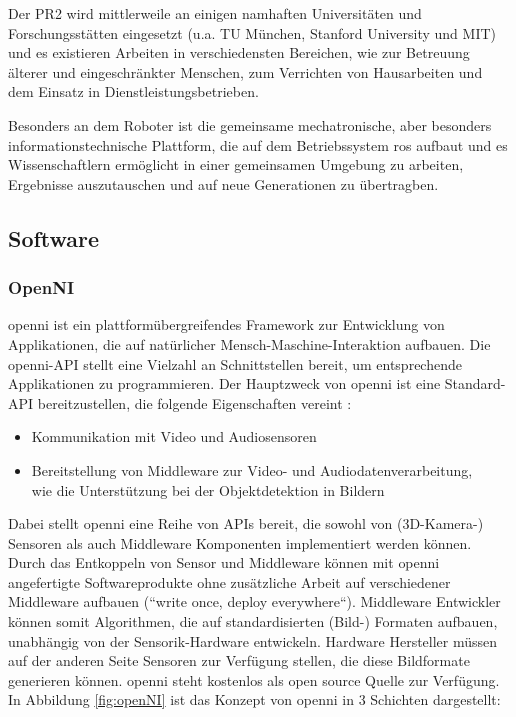 Der PR2 wird mittlerweile an einigen namhaften Universitäten und Forschungsstätten eingesetzt
 (u.a. TU München, Stanford University und MIT) und es existieren Arbeiten in verschiedensten Bereichen,
 wie zur Betreuung älterer und eingeschränkter Menschen, zum Verrichten von Hausarbeiten  und dem Einsatz
 in Dienstleistungsbetrieben.

Besonders an dem Roboter ist die gemeinsame mechatronische, aber besonders informationstechnische Plattform,
 die auf dem Betriebssystem \gls{ros} aufbaut und es Wissenschaftlern
 ermöglicht in einer gemeinsamen Umgebung zu arbeiten, Ergebnisse auszutauschen und auf neue Generationen zu übertragben.

\subsection{Software}

\subsubsection{OpenNI}

\gls{openni} ist ein plattformübergreifendes Framework zur Entwicklung von
Applikationen, die auf natürlicher Mensch-Maschine-Interaktion aufbauen.
 Die \gls{openni}-API stellt eine Vielzahl an Schnittstellen bereit, um
 entsprechende Applikationen zu programmieren. Der Hauptzweck von \gls{openni}
  ist eine Standard-API bereitzustellen, die folgende Eigenschaften vereint \citep{openNI2012}:

\begin{itemize}
  \item Kommunikation mit Video und Audiosensoren
  \item Bereitstellung von Middleware zur Video- und Audiodatenverarbeitung,\\
  wie die Unterstützung bei der Objektdetektion in Bildern
\end{itemize}

Dabei stellt \gls{openni} eine Reihe von APIs bereit, die sowohl von  (3D-Kamera-)
 Sensoren als auch Middleware Komponenten implementiert werden können.
 Durch das Entkoppeln von Sensor und Middleware können mit \gls{openni} angefertigte Softwareprodukte
 ohne zusätzliche Arbeit auf verschiedener Middleware aufbauen (“write once, deploy everywhere“).
 Middleware Entwickler können somit Algorithmen, die auf standardisierten (Bild-) Formaten aufbauen,
 unabhängig von der Sensorik-Hardware entwickeln. Hardware Hersteller müssen auf der anderen Seite
 Sensoren zur Verfügung stellen, die diese Bildformate generieren können. \gls{openni} steht kostenlos
 als open source Quelle zur Verfügung. In Abbildung \ref{fig:openNI} ist das
 Konzept von \gls{openni} in 3 Schichten dargestellt:

